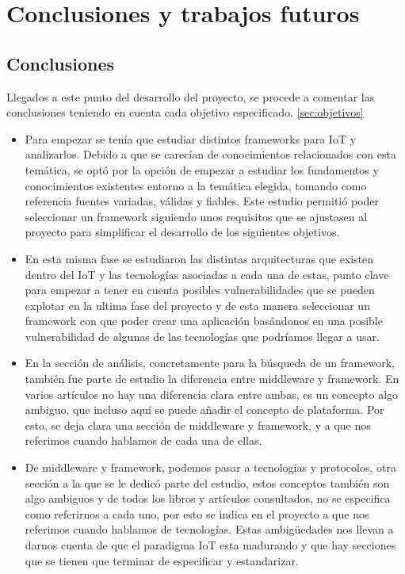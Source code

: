 \chapter{Conclusiones y trabajos futuros}

{\color{blue}

\section{Conclusiones}

Llegados a este punto del desarrollo del proyecto, se procede a comentar las conclusiones teniendo en cuenta cada objetivo especificado. \ref{sec:objetivos}

\begin{itemize}
    \item Para empezar se tenía que estudiar distintos frameworks para IoT y analizarlos. Debido a que se carecían de conocimientos relacionados con esta temática, se optó por la opción de empezar a estudiar los fundamentos y conocimientos existentes entorno a la temática elegida, tomando como referencia fuentes variadas, válidas y fiables. Este estudio permitió poder seleccionar un framework siguiendo unos requisitos que se ajustasen al proyecto para simplificar el desarrollo de los siguientes objetivos.
    \item En esta misma fase se estudiaron las distintas arquitecturas que existen dentro del IoT y las tecnologías asociadas a cada una de estas, punto clave para empezar a tener en cuenta posibles vulnerabilidades que se pueden explotar en la ultima fase del proyecto y de esta manera seleccionar un framework con que poder crear una aplicación basándonos en una posible vulnerabilidad de algunas de las tecnologías que podríamos llegar a usar.
    \item En la sección de análisis, concretamente para la búsqueda de un framework, también fue parte de estudio la diferencia entre middleware y framework. En varios artículos no hay una diferencia clara entre ambas, es un concepto algo ambiguo, que incluso aquí se puede añadir el concepto de plataforma. Por esto, se deja clara una sección de middleware y framework, y a que nos referimos cuando hablamos de cada una de ellas.
    \item De middleware y framework, podemos pasar a tecnologías y protocolos, otra sección a la que se le dedicó parte del estudio, estos conceptos también son algo ambiguos y de todos los libros y artículos consultados, no se especifica como referirnos a cada uno, por esto se indica en el proyecto a que nos referimos cuando hablamos de tecnologías. Estas ambigüedades nos llevan a darnos cuenta de que el paradigma IoT esta madurando y que hay secciones que se tienen que terminar de especificar y estandarizar.

\end{itemize}}
